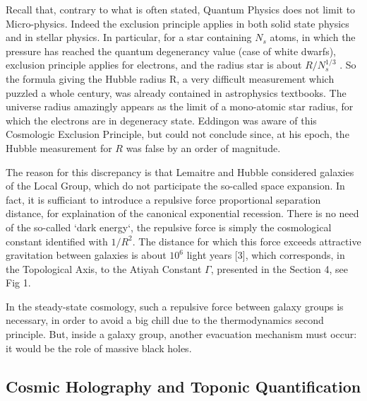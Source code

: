 \documentclass[twoside,draft]{article}
\begin{document}
\begin{sloppypar}
{Recall that, contrary to what is often stated, Quantum Physics does not limit to Micro-physics.
Indeed the exclusion principle applies in both solid state physics and in stellar physics. In particular,
for a star containing $N_s$ atoms, in which the pressure has reached the quantum degenerancy value
(case of white dwarfs), exclusion principle applies for electrons, and the radius star is about $R/N_{s}^{1/3}$ .
So the formula giving the Hubble radius R, a very difficult measurement which puzzled a whole
century, was already contained in astrophysics textbooks. The universe radius amazingly appears as
the limit of a mono-atomic star radius, for which the electrons are in degeneracy state. Eddingon was
aware of this Cosmologic Exclusion Principle, but could not conclude since, at his epoch, the
Hubble measurement for $R$ was false by an order of magnitude.

The reason for this discrepancy is that Lemaitre and Hubble considered galaxies of the Local
Group, which do not participate the so-called space expansion. In fact, it is sufficiant to introduce a
repulsive force proportional separation distance, for explaination of the canonical
exponential recession. There is no need of the so-called `dark energy`, the repulsive force is simply
the cosmological constant identified with $1/R^{2}$. The distance for which this force exceeds attractive
gravitation between galaxies is about $10^{6}$ light years [3], which corresponds, in the Topological
Axis, to the Atiyah Constant $\Gamma$, presented in the Section 4, see Fig 1.

In the steady-state cosmology, such a repulsive force between galaxy groups is necessary, in
order to avoid a big chill due to the thermodynamics second principle. But, inside a galaxy group,
another evacuation mechanism must occur: it would be the role of massive black holes.



\subsection{Cosmic Holography and Toponic Quantification}

}
\end{sloppypar}
\end{document}
